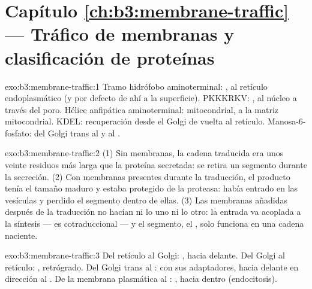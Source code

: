\section*{Capítulo \ref{ch:b3:membrane-traffic} --- Tráfico de membranas y clasificación de proteínas}

\begin{solution}{exo:b3:membrane-traffic:1}
Tramo hidrófobo aminoterminal: , al retículo endoplasmático
(y por defecto de ahí a la superficie). PKKKRKV: , al núcleo a través del poro. Hélice anfipática aminoterminal:
 mitocondrial, a la matriz mitocondrial. KDEL: recuperación
desde el Golgi de vuelta al retículo. Manosa-6-fosfato: del Golgi trans
al  y al .
\end{solution}

\begin{solution}{exo:b3:membrane-traffic:2}
(1) Sin membranas, la cadena traducida era unos veinte residuos más larga
que la proteína secretada: se retira un segmento durante la secreción.
(2) Con membranas presentes durante la traducción, el producto tenía el
tamaño maduro y estaba protegido de la proteasa: había entrado en las
vesículas y perdido el segmento dentro de ellas. (3) Las membranas
añadidas después de la traducción no hacían ni lo uno ni lo otro: la
entrada va acoplada a la síntesis --- es cotraduccional --- y el
segmento, el , solo funciona en una cadena naciente.
\end{solution}

\begin{solution}{exo:b3:membrane-traffic:3}
Del retículo al Golgi: , hacia delante. Del Golgi al retículo:
, retrógrado. Del Golgi trans al :  con sus
adaptadores, hacia delante en dirección al . De la membrana
plasmática al : , hacia dentro (endocitosis).
\end{solution}

